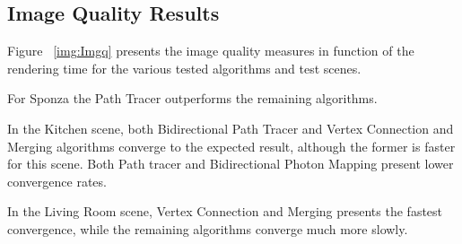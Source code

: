 \subsection{\label{subsec:imgq} Image Quality Results}

Figure ~\ref{img:Imgq} presents the image quality measures in function of the rendering time for the various tested algorithms and test scenes.

For Sponza the Path Tracer outperforms the remaining algorithms.

In the Kitchen scene, both Bidirectional Path Tracer and Vertex Connection and Merging algorithms converge to the expected result, although the former is faster for this scene. Both Path tracer and Bidirectional Photon Mapping present lower convergence rates.

In the Living Room scene, Vertex Connection and Merging presents the fastest convergence, while the remaining algorithms converge much more slowly.

